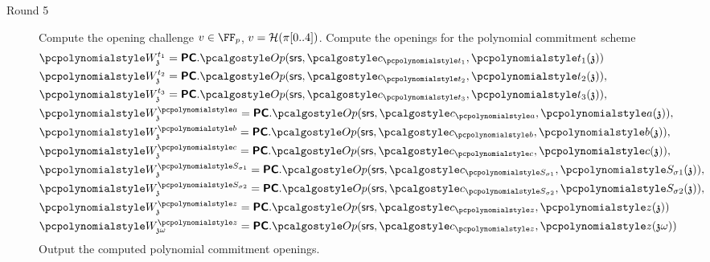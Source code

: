 \documentclass[runningheads,11pt]{llncs}
\begin{document}
\begin{description}
	\item[Round 5]
	Compute the opening challenge $v \in \FF_p$, $v = \mathcal{H}(\pi[0..4])$.
	Compute the openings for the polynomial commitment scheme
  \begin{align*}
    & \p{W_\chz^{t_1}} = \PCOM.\open(\srs, \cp{t_{1}}, \p{t_1}(\chz)) \\
    & \p{W_\chz^{t_2}} = \PCOM.\open(\srs, \cp{t_{2}}, \p{t_2}(\chz)), \\
    & \p{W_\chz^{t_3}} = \PCOM.\open(\srs, \cp{t_{3}}, \p{t_3}(\chz)), \\
    & \p{W_\chz^{\p{a}}} = \PCOM.\open(\srs, \cp{a}, \p{a}(\chz)), \\
    & \p{W_\chz^{\p{b}}} = \PCOM.\open(\srs, \cp{b}, \p{b}(\chz)), \\
    & \p{W_\chz^{\p{c}}} = \PCOM.\open(\srs, \cp{c}, \p{c}(\chz)), \\
    & \p{W_\chz^{\p{S_{\sigma 1}}}} = \PCOM.\open(\srs, \cp{S_{\sigma 1}}, \p{S_{\sigma 1}}(\chz)), \\
    & \p{W_\chz^{\p{S_{\sigma 2}}}} = \PCOM.\open(\srs, \cp{S_{\sigma 2}}, 
      \p{S_{\sigma 2}}(\chz)), \\
    & \p{W_{\chz}^{\p{z}}} = \PCOM.\open(\srs, \cp{z}, \p{z}(\chz)) \\
    & \p{W_{\chz \omega}^{\p{z}}} = \PCOM.\open(\srs, \cp{z}, \p{z}(\chz \omega))
 \end{align*}
 Output the computed polynomial commitment openings.
\end{description}
\end{document}
